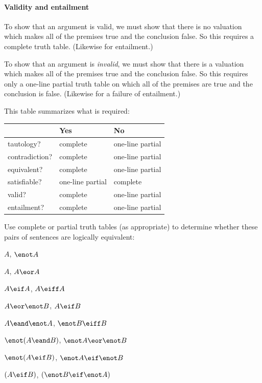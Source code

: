 \paragraph{Validity and entailment}
To show that an argument is valid, we must show that there is no valuation which makes all of the premises true and the conclusion false. So this  requires a complete truth table.  (Likewise for entailment.)

To show that an argument is \emph{invalid}, we must show that there is a valuation which makes all of the premises true and the conclusion false. So this requires only a one-line partial truth table on which all of the premises are true and the conclusion is false. (Likewise for a failure of entailment.)

This table summarizes what is required:

\begin{center}
\begin{tabular}{l l l}
 & \textbf{Yes} & \textbf{No}\\
 \hline
tautology? & complete & one-line partial \\
contradiction? &  complete & one-line partial \\
equivalent? & complete  & one-line partial \\
satisfiable? & one-line partial & complete \\
valid? & complete & one-line partial \\
entailment? & complete & one-line partial\\
\end{tabular}
\end{center}
\label{table.CompleteVsPartial}


\practiceproblems

\problempart
\label{pr.TT.equiv3}
Use complete or partial truth tables (as appropriate) to determine whether these pairs of sentences are logically equivalent:
\begin{compactlist}
\item $A$, $\enot A$ %
\item $A$, $A \eor A$ %
\item $A\eif A$, $A \eiff A$ %
\item $A \eor \enot B$, $A\eif B$ %
\item $A \eand \enot A$, $\enot B \eiff B$ %
\item $\enot(A \eand B)$, $\enot A \eor \enot B$ %
\item $\enot(A \eif B)$, $\enot A \eif \enot B$ %
\item $(A \eif B)$, $(\enot B \eif \enot A)$ %
\end{compactlist}


